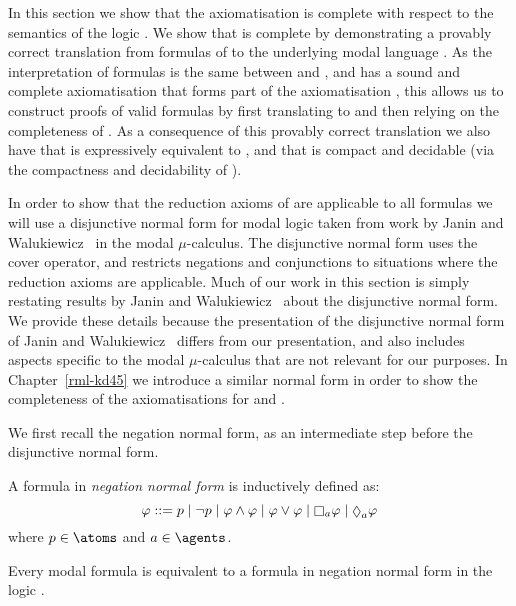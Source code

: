 In this section we show that the axiomatisation \axiomRmlK{} is complete with respect to the semantics of the logic \logicRmlK{}.
We show that \axiomRmlK{} is complete by demonstrating a provably correct translation from formulas of \langRml{} to the underlying modal language \langMl{}.
As the interpretation of \langMl{} formulas is the same between \logicRmlK{} and \logicK{}, and \logicK{} has a sound and complete axiomatisation \axiomK{} that forms part of the axiomatisation \logicRmlK{}, this allows us to construct proofs of valid \langRml{} formulas by first translating to \langMl{} and then relying on the completeness of \axiomK{}.
As a consequence of this provably correct translation we also have that \logicRmlK{} is expressively equivalent to \logicK{}, and that \logicRmlK{} is compact and decidable (via the compactness and decidability of \logicK{}).

In order to show that the reduction axioms of \axiomRmlK{} are applicable to all \langRml{} formulas we will use a disjunctive normal form for modal logic taken from work by Janin and Walukiewicz~\cite{janin:1995} in the modal $\mu$-calculus.
The disjunctive normal form uses the cover operator, and restricts negations and conjunctions to situations where the reduction axioms are applicable.
Much of our work in this section is simply restating results by Janin and Walukiewicz~\cite{janin:1995} about the disjunctive normal form.
We provide these details because the presentation of the disjunctive normal form of Janin and Walukiewicz~\cite{janin:1995} differs from our presentation, and also includes aspects specific to the modal $\mu$-calculus that are not relevant for our purposes.
In Chapter~\ref{rml-kd45} we introduce a similar normal form in order to show the completeness of the axiomatisations for \logicRmlKFF{} and \logicRmlKD{}.

We first recall the negation normal form, as an intermediate step before the disjunctive normal form.

\begin{definition}
A formula in {\em negation normal form} is inductively defined as:
$$
\phi ::= \atomP \mid
         \lnot \atomP \mid
         \phi \land \phi \mid
         \phi \lor \phi \mid
         \necessaryA \phi \mid
         \possibleA \phi
$$
where $\atomP \in \atoms$ and $\agentA \in \agents$.
\end{definition}

\begin{lemma}\label{nnf-equivalent}
Every modal formula is equivalent to a formula in negation normal form in the logic \logicK{}.
\end{lemma}

